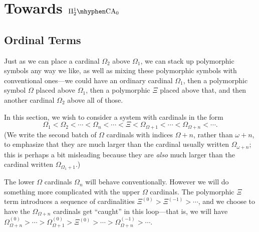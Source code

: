 \documentclass[11pt]{amsart}
\theoremstyle{definition}
\begin{document}
\section{Towards $\Pi^1_2\mhyphen\mathrm{CA}_0$}
\subsection{Ordinal Terms}

Just as we can place a cardinal $\Omega_2$ above $\Omega_1$, we can stack up polymorphic symbols any way we like, as well as mixing these polymorphic symbols with conventional ones---we could have an ordinary cardinal $\Omega_1$, then a polymorphic symbol $\Omega$ placed above $\Omega_1$, then a polymorphic $\Xi$ placed above that, and then another cardinal $\Omega_2$ above all of those.

In this section, we wish to consider a system with cardinals in the form
\[\Omega_1<\Omega_2<\cdots<\Omega_n<\cdots<\Xi<\Omega_{\Omega+1}<\cdots<\Omega_{\Omega+n}<\cdots.\]
(We write the second batch of $\Omega$ cardinals with indices $\Omega+n$, rather than $\omega+n$, to emphasize that they are much larger than the cardinal usually written $\Omega_{\omega+n}$; this is perhaps a bit misleading because they are \emph{also} much larger than the cardinal written $\Omega_{\Omega_1+1}$.)

The lower $\Omega$ cardinals $\Omega_n$ will behave conventionally. However we will do something more complicated with the upper $\Omega$ cardinals. The polymorphic $\Xi$ term introduces a sequence of cardinalities $\Xi^{(0)}>\Xi^{(-1)}>\cdots$, and we choose to have the $\Omega_{\Omega+n}$ cardinals get ``caught'' in this loop---that is, we will have $\Omega_{\Omega+n}^{(0)}>\cdots>\Omega_{\Omega+1}^{(0)}>\Xi^{(0)}>\cdots>\Omega_{\Omega+n}^{(-1)}>\cdots$.
\end{document}
